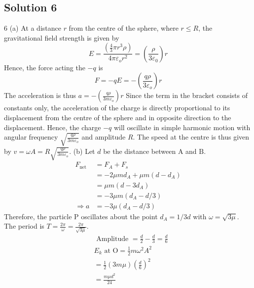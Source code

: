 \documentclass{article}
\begin{document}
\subsection{Solution 6}
6 (a) At a distance $r$ from the centre of the sphere, where $r \leq R$, the gravitational field strength is given by
$$
E=\frac{\left(\frac{4}{3} \pi r^{3} \rho\right)}{4 \pi \varepsilon_{o} r^{2}}=\left(\frac{\rho}{3 \varepsilon_{0}}\right) r
$$
Hence, the force acting the $-q$ is
$$
F=-q E=-\left(\frac{q \rho}{3 \varepsilon_{o}}\right) r
$$
The acceleration is thus $a=-\left(\frac{q \rho}{3 m \varepsilon_{o}}\right) r$
Since the term in the bracket consists of constants only, the acceleration of the charge is directly proportional to its displacement from the centre of the sphere and in opposite direction to the displacement. Hence, the charge $-q$ will oscillate in simple harmonic motion with angular frequency $\sqrt{\frac{q \rho}{3 m \varepsilon_{o}}}$ and amplitude $R$.
The speed at the centre is thus given by $v=\omega A=R \sqrt{\frac{q \rho}{3 m \varepsilon_{o}}}$.
(b) Let $d$ be the distance between $\mathrm{A}$ and $\mathrm{B}$.
$$
\begin{aligned}
	F_{\text {net }} &=F_{A}+F_{s} \\
	&=-2 \mu m d_{A}+\mu m\left(d-d_{A}\right) \\
	&=\mu m\left(d-3 d_{A}\right) \\
	&=-3 \mu m\left(d_{A}-d / 3\right) \\
	\Rightarrow a &=-3 \mu\left(d_{A}-d / 3\right)
\end{aligned}
$$
Therefore, the particle P oscillates about the point $d_{A}=1 / 3 d$ with $\omega=\sqrt{3 \mu}$.
The period is $T=\frac{2 \pi}{\omega}=\frac{2 \pi}{\sqrt{3 \mu}}$.
$$
\begin{aligned}
	&\text { Amplitude }=\frac{d}{2}-\frac{d}{3}=\frac{d}{6} \\
	&E_{k} \text { at } \mathrm{O}=\frac{1}{2} m \omega^{2} A^{2} \\
	&=\frac{1}{2}(3 m \mu)\left(\frac{d}{6}\right)^{2} \\
	&=\frac{m \mu d^{2}}{24}
\end{aligned}
$$
\end{document}
